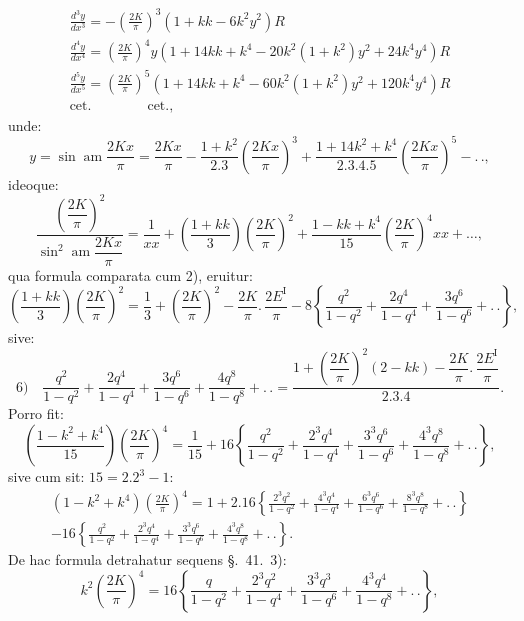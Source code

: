 \documentclass{article}
\begin{document}
\[
\begin{gathered}
\frac{d^{3}y}{dx^{3}}=-\left(\frac{2K}{\pi}\right)^{3}(1+kk-6k^{2}y^{2})R\\[1.5ex]
\frac{d^{4}y}{dx^{4}}=\left(\frac{2K}{\pi}\right)^{4}y\left(1+14kk+k^{4}-20k^{2}(1+k^{2})y^{2}+24k^{4}y^{4}\right)R\\[1.5ex]
\frac{d^{5}y}{dx^{5}}=\left(\frac{2K}{\pi}\right)^{5}\left(1+14kk+k^{4}-60k^{2}(1+k^{2})y^{2}+120k^{4}y^{4}\right)R\\[1.5ex]
\text{cet.}\qquad\qquad\text{cet.},
\end{gathered}
\]
unde:
\[
y=\sin\operatorname{am}\frac{2Kx}{\pi}=\frac{2Kx}{\pi}-\frac{1+k^{2}}{2.3}\left(\frac{2Kx}{\pi}\right)^{3}+\frac{1+14k^{2}+k^{4}}{2.3.4.5}\left(\frac{2Kx}{\pi}\right)^{5}-.\,.,
\]
ideoque:
\[
\frac{\left(\dfrac{2K}{\pi}\right)^{2}}{\sin^{2}\operatorname{am}\dfrac{2Kx}{\pi}}=\frac{1}{xx}+\left(\frac{1+kk}{3}\right)\left(\frac{2K}{\pi}\right)^{2}+\frac{1-kk+k^{4}}{15}\left(\frac{2K}{\pi}\right)^{4}xx+\ldots,
\]
qua formula comparata cum 2), eruitur:
\[
\left(\frac{1+kk}{3}\right)\left(\frac{2K}{\pi}\right)^{2}=\frac{1}{3}+\left(\frac{2K}{\pi}\right)^{2}-\frac{2K}{\pi}.\,\frac{2E^{\mathrm{I}}}{\pi}-8\left\{\frac{q^{2}}{1-q^{2}}+\frac{2q^{4}}{1-q^{4}}+\frac{3q^{6}}{1-q^{6}}+.\,.\right\},
\]
sive:
\[
\text{6)}\quad\frac{q^{2}}{1-q^{2}}+\frac{2q^{4}}{1-q^{4}}+\frac{3q^{6}}{1-q^{6}}+\frac{4q^{8}}{1-q^{8}}+.\,.=\frac{1+\left(\dfrac{2K}{\pi}\right)^{2}(2-kk)-\dfrac{2K}{\pi}.\,\dfrac{2E^{\mathrm{I}}}{\pi}}{2.3.4}.
\]
Porro fit:
\[
\left(\frac{1-k^{2}+k^{4}}{15}\right)\left(\frac{2K}{\pi}\right)^{4}=\frac{1}{15}+16\left\{\frac{q^{2}}{1-q^{2}}+\frac{2^{3}q^{4}}{1-q^{4}}+\frac{3^{3}q^{6}}{1-q^{6}}+\frac{4^{3}q^{8}}{1-q^{8}}+.\,.\right\},
\]
sive cum sit: $15=2.2^{3}-1$:
\[
\begin{gathered}
(1-k^{2}+k^{4})\left(\frac{2K}{\pi}\right)^{4}=1+2.16\left\{\frac{2^{3}q^{2}}{1-q^{2}}+\frac{4^{3}q^{4}}{1-q^{4}}+\frac{6^{3}q^{6}}{1-q^{6}}+\frac{8^{3}q^{8}}{1-q^{8}}+.\,.\right\}\\[1.5ex]
-16\left\{\frac{q^{2}}{1-q^{2}}+\frac{2^{3}q^{4}}{1-q^{4}}+\frac{3^{3}q^{6}}{1-q^{6}}+\frac{4^{3}q^{8}}{1-q^{8}}+.\,.\right\}.
\end{gathered}
\]
De hac formula detrahatur sequens §.\ 41.\ 3):
\[
k^{2}\left(\frac{2K}{\pi}\right)^{4}=16\left\{\frac{q}{1-q^{2}}+\frac{2^{3}q^{2}}{1-q^{4}}+\frac{3^{3}q^{3}}{1-q^{6}}+\frac{4^{3}q^{4}}{1-q^{8}}+.\,.\right\},
\]
\end{document}
